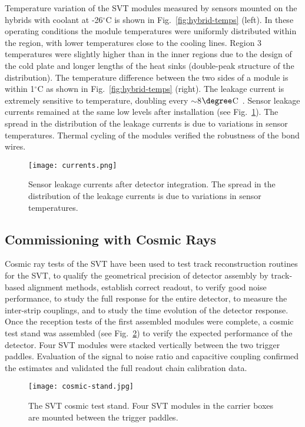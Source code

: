 Temperature variation of the SVT modules measured by sensors mounted on the hybrids with coolant at -26$^\circ$C is shown in Fig.~\ref{fig:hybrid-temps} (left). In these operating conditions the module temperatures were uniformly distributed within the region, with lower temperatures close to the cooling lines. Region 3 temperatures were slightly higher than in the inner regions due to the design of the cold plate and longer lengths of the heat sinks (double-peak structure of the distribution). The temperature difference between the two sides of a module is within 1$^\circ$C as shown in Fig.~\ref{fig:hybrid-temps} (right). The leakage current is extremely sensitive to temperature, doubling every $\sim$8$\degree$C~\cite{SZE}. Sensor leakage currents remained at the same low levels after installation (see Fig.~\ref{fig:currents}). The spread in the distribution of the leakage currents is due to variations in sensor temperatures. Thermal cycling of the modules verified the robustness of the bond wires.

\begin{figure}[hbt] 
\centering 
\texttt{[image: currents.png]}
\caption{Sensor leakage currents after detector integration. The spread in the distribution of the leakage currents is due to variations in sensor temperatures.}
\label{fig:currents}
\end{figure}

\subsection{Commissioning with Cosmic Rays}

Cosmic ray tests of the SVT have been used to test track reconstruction routines for the SVT, to qualify the geometrical precision of detector assembly by track-based alignment methods, establish correct readout, to verify good noise performance, to study the full response for the entire detector, to measure the inter-strip couplings, and to study the time evolution of the detector response. Once the reception tests of the first assembled modules were complete, a cosmic test stand was assembled (see Fig.~\ref{fig:cosmic-stand}) to verify the expected performance of the detector. Four SVT modules were stacked vertically between the two trigger paddles. Evaluation of the signal to noise ratio and capacitive coupling confirmed the estimates and validated the full readout chain calibration data.

\begin{figure}[hbt] 
\centering 
\texttt{[image: cosmic-stand.jpg]}
\caption{The SVT cosmic test stand. Four SVT modules in the carrier boxes are mounted between the trigger paddles.}
\label{fig:cosmic-stand}
\end{figure}

